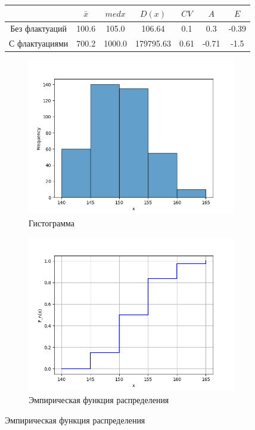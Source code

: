 \documentclass[12pt,a4paper]{article}
\begin{document}
\begin{figure}
		\begin{subtable}[htbp!]{0.8\textwidth}
			\centering
			\begin{tabular}{ |c|c|c|c|c|c|c| }
				\hline
				& \( \bar x \) & \( med x \) & \( D(x) \) & \( CV \) & \( A \) & \( E \) \\
				\hline
				Без флактуаций & 100.6 & 105.0 & 106.64 & 0.1 & 0.3 & -0.39 \\
				\hline
				С флактуациями & 700.2 & 1000.0 & 179795.63 & 0.61 & -0.71 & -1.5 \\
				\hline
			\end{tabular}
		\end{subtable}
	\end{figure}

	\begin{figure}
		\begin{subfigure}[htbp!]{0.8\textwidth}
			\begin{center}
				\includegraphics[width = 0.8\linewidth]{../graphics/6_hist.png}
				\caption{Гистограмма}
			\end{center}
		\end{subfigure}

		\begin{subfigure}[htbp!]{0.8\textwidth}
			\begin{center}
				\includegraphics[width = 0.8\linewidth]{../graphics/6_cdf.png}
				\caption{Эмпирическая функция распределения}
			\end{center}
		\end{subfigure}


\end{figure}
\end{document}
